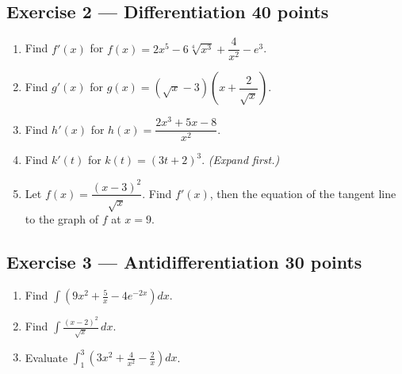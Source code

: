 \documentclass[11pt]{article}
\begin{document}
\newpage
\subsection*{Exercise 2 --- Differentiation \hfill {\normalsize\color{fnavy}40 points}}
\begin{enumerate}[label=\textbf{(\alph*)},leftmargin=*,itemsep=4pt]
\item Find $f'(x)$ for $f(x)=2x^5-6\sqrt[4]{x^3}+\dfrac{4}{x^2}-e^3$. \answerspace{3.2cm}
\item Find $g'(x)$ for $g(x)=\left(\sqrt{x}-3\right)\left(x+\dfrac{2}{\sqrt{x}}\right)$. \answerspace{3.2cm}
\item Find $h'(x)$ for $h(x)=\dfrac{2x^3+5x-8}{x^2}$. \answerspace{3.2cm}
\item Find $k'(t)$ for $k(t)=(3t+2)^3$. \emph{(Expand first.)} \answerspace{3.2cm}
\item Let $f(x)=\dfrac{(x-3)^2}{\sqrt{x}}$. Find $f'(x)$, then the equation of the tangent line to the graph of $f$ at $x=9$. \answerspace{4cm}
\end{enumerate}

\newpage
\subsection*{Exercise 3 --- Antidifferentiation \hfill {\normalsize\color{fnavy}30 points}}
\begin{enumerate}[label=\textbf{(\alph*)},leftmargin=*,itemsep=4pt]
\item Find $\displaystyle\int\left(9x^2+\frac{5}{x}-4e^{-2x}\right)dx$. \answerspace{5cm}
\item Find $\displaystyle\int\frac{(x-2)^2}{\sqrt{x}}\,dx$. \answerspace{5cm}
\item Evaluate $\displaystyle\int_{1}^{3}\left(3x^2+\frac{4}{x^2}-\frac{2}{x}\right)dx$. \answerspace{4cm}
\end{enumerate}
\end{document}
